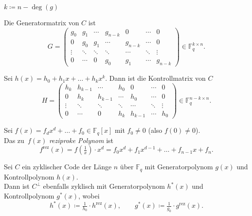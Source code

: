 \documentclass{cheat-sheet}
\newcommand{\F}{\mathbb{F}} %
\newcommand{\rez}{\mathrm{rez}} %
\begin{document}
\begin{nota}
  $k \coloneqq n - \deg(g)$
\end{nota}

\begin{bem}
  Die Generatormatrix von $C$ ist
  \[
    G = \begin{pmatrix}
      g_0 & g_1 & \cdots & g_{n-k} & 0 & \cdots & 0 \\
      0 & g_0 & g_1 & \cdots & g_{n-k} & \cdots & 0 \\
      \vdots & \ddots & \ddots & \ddots & \cdots & \ddots & \vdots \\
      0 & \cdots & 0 & g_0 & g_1 & \cdots & g_{n-k}
    \end{pmatrix} \in \F_q^{k \times n}.
  \]
\end{bem}

\begin{prop}
  Sei $h(x) = h_0 + h_1 x + \ldots + h_k x^k$.
  Dann ist die Kontrollmatrix von $C$
  \[
    H = \begin{pmatrix}
      h_k & h_{k-1} & \cdots & h_0 & 0 & \cdots & 0 \\
      0 & h_k & h_{k-1} & \cdots & h_0 & \cdots & 0 \\
      \vdots & \ddots & \ddots & \ddots & \cdots & \ddots & \vdots \\
      0 & \cdots & 0 & h_k & h_{k-1} & \cdots & h_0
    \end{pmatrix} \in \F_q^{n - k \times n}.
  \]
\end{prop}


\begin{defn}
  Sei $f(x) = f_d x^d + \ldots + f_0 \in \F_q[x]$ mit $f_0 \neq 0$ (also $f(0) \neq 0$). \\
  Das zu~$f(x)$ \emph{reziproke Polynom} ist
  \[
    f^\rez(x) = f(\tfrac{1}{x}) \cdot x^d = f_0 x^d + f_1 x^{d-1} + \ldots + f_{n-1} x + f_n.
  \]
\end{defn}

\begin{satz}
  Sei $C$ ein zyklischer Code der Länge $n$ über $\F_q$ mit Generatorpolynom $g(x)$ und Kontrollpolynom $h(x)$. \\
  Dann ist $C^\perp$ ebenfalls zyklisch mit Generatorpolynom $h^*(x)$ und Kontrollpolynom $g^*(x)$, wobei
  \[
    h^*(x) \coloneqq \tfrac{1}{h_0} \cdot h^\rez(x), \qquad
    g^*(x) \coloneqq \tfrac{1}{g_0} \cdot g^\rez(x).
  \]
\end{satz}
\end{document}
